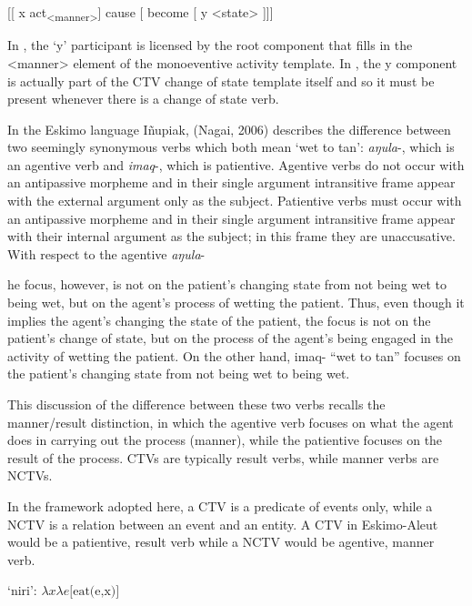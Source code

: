 \documentclass[output=paper,modfonts,nonflat]{langsci/langscibook}
\begin{document}
\ea%
    \label{ex:key:6}
    \gll\\
        \\
    \glt
    \z

           [[ x act\textsubscript{<manner>}] cause [ become  [ y <state> ]]]

In , the ‘y’ participant is licensed by the root component that fills in the <manner> element of the monoeventive activity template.  In , the y component is actually part of the CTV change of state template itself and so it must be present whenever there is a change of state verb.

In the Eskimo language Iñupiak, (Nagai, 2006) describes the difference between two seemingly synonymous verbs which both mean ‘wet to tan’: \textit{aŋula}{}-, which is an agentive verb and \textit{imaq}{}-, which is patientive.  Agentive verbs do not occur with an antipassive morpheme and in their single argument intransitive frame appear with the external argument only as the subject.  Patientive verbs must occur with an antipassive morpheme and in their single argument intransitive frame appear with their internal argument as the subject; in this frame they are unaccusative.  With respect to the agentive \textit{aŋula}{}-

\begin{stylepi}
[t]he focus, however, is not on the patient’s changing state from not being wet to being wet, but on the agent’s process of wetting the patient. Thus, even though it implies the agent’s changing the state of the patient, the focus is not on the patient’s change of state, but on the process of the agent’s being engaged in the activity of wetting the patient. On the other hand, imaq- “wet to tan” focuses on the patient’s changing state from not being wet to being wet.
\end{stylepi}

This discussion of the difference between these two verbs recalls the manner/result distinction, in which the agentive verb focuses on what the agent does in carrying out the process (manner), while the patientive focuses on the result of the process. CTVs are typically result verbs, while manner verbs are NCTVs.

In the framework adopted here, a CTV is a predicate of events only, while a NCTV is a relation between an event and an entity.   A CTV in Eskimo-Aleut would be a patientive, result verb while a NCTV would be agentive, manner verb.

           ‘niri’:   $\mathit{\lambda x\lambda e}\text{[eat(e,x)]}$
\end{document}
